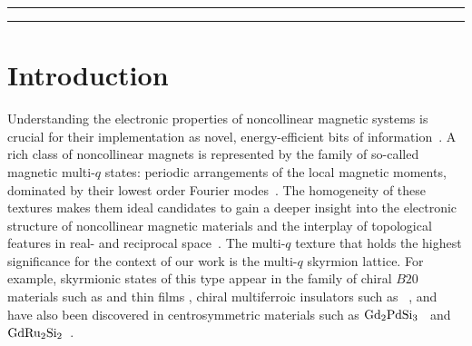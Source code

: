 \documentclass[submission, Phys]{SciPost}
\begin{document}
\vspace{10pt}
\noindent\rule{\textwidth}{1pt}
\setcounter{tocdepth}{2}
\tableofcontents\thispagestyle{fancy}
\noindent\rule{\textwidth}{1pt}
\vspace{10pt}

\section{Introduction}
\label{sec:introduction}

Understanding the electronic properties of noncollinear magnetic systems is crucial for their implementation as novel, energy-efficient bits of information~\cite{Fert2013, Fert2017, Back2020}. 
A rich class of noncollinear magnets is represented by the family of so-called magnetic multi-$q$ states: periodic arrangements of the local magnetic moments, dominated by their lowest order Fourier modes~\cite{Heinze2011,Hayami2021,Shimizu2022}.  
The homogeneity of these textures makes them ideal candidates to gain a deeper insight into the electronic structure of noncollinear magnetic materials and the interplay of topological features in real- and reciprocal space~\cite{Hamamoto2015,Gobel2017,Gobel2017b,Lux2024,Matsui2021,Tome2021,Gong2021,Divic2022,Hayami2023}.
The multi-$q$ texture that holds the highest significance for the context of our work is the multi-$q$ skyrmion lattice. 
For example, skyrmionic states of this type appear in the family of chiral $B20$ materials such as  \cite{Muhlbauer2009, Neubauer2009} and  thin films \cite{Munzer2010,Yu2010}, chiral multiferroic insulators such as ~\cite{Seki2012, Langner2014}, and have also been discovered in centrosymmetric materials such as $\ce{Gd2PdSi3}$~\cite{Kurumaji2019} and $\ce{GdRu2Si2}$~\cite{Khanh2020}.
\end{document}
